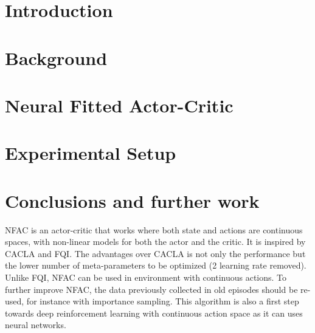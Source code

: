 \documentclass{style/esannV2}
\begin{document}
\section{Introduction}



\section{Background}



\section{Neural Fitted Actor-Critic}



\section{Experimental Setup}



\section{Conclusions and further work}
NFAC is an actor-critic that works where both state and actions are continuous spaces, 
with non-linear models for both the actor and the critic.
It is inspired by CACLA and FQI.
The advantages over CACLA is not only the performance but the lower 
number of meta-parameters to be optimized (2 learning rate removed).
Unlike FQI, NFAC can be used in environment with continuous actions.
To further improve NFAC, the data previously collected in old episodes should be re-used, for instance with importance sampling.
This algorithm is also a first step towards deep reinforcement learning with continuous action space
as it can uses neural networks.


\end{document}
